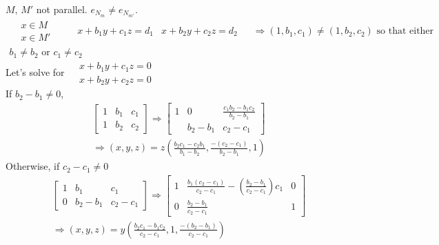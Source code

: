 \documentclass[twoside]{amsart}
\theoremstyle{plain}
\theoremstyle{definition}
\newcommand{\exercisehead}[1]
  {\smallskip
   \noindent{\small\bf Exercise #1.}}
\begin{document}
\exercisehead{22} $M, \, M'$ not parallel.  $e_{N_m} \neq e_{N_{m'}}$. 
\[
\begin{gathered}
\begin{aligned}
  & x \in M \\
  &  x \in M'
\end{aligned} \quad \, \begin{aligned}
  & x + b_1 y + c_1 z = d_1 
  & x + b_2 y + c_2 z = d_2
\end{aligned} \quad \, \Longrightarrow (1,b_1,c_1) \neq (1,b_2,c_2) \text{ so that either } \\
b_1 \neq b_2 \text{ or } c_1 \neq c_2
\end{gathered}
\]
Let's solve for $\begin{aligned}
  & x + b_1 y + c_1 z = 0 \\
  & x + b_2 y + c_2 z = 0
\end{aligned}$ \quad \medskip \\
If $b_2 - b_1 \neq 0$,
\[
\begin{gathered}
  \left[ \begin{matrix} 1 & b_1 & c_1 \\
      1 & b_2 & c_2 
      \end{matrix} \right] \Longrightarrow \left[ \begin{matrix} 1 & 0 & \frac{ c_1 b_2 -b_1 c_2 }{ b_2 - b_1 } \\
      & b_2 -b_1 & c_2 - c_1 \end{matrix} \right] \\
  \Longrightarrow (x,y,z) = z \left( \frac{ b_2 c_1 - c_2 b_1}{ b_1 - b_2 }, \frac{ - (c_2 -c_1) }{ b_2 - b_1 }, 1 \right)
\end{gathered}
\]
Otherwise, if $c_2 - c_1 \neq 0$
\[
\begin{gathered}
  \left[ \begin{matrix} 1 & b_1 & c_1 \\
      0 & b_2 - b_1 & c_2 - c_1 
      \end{matrix} \right] \Longrightarrow \left[ 
    \begin{matrix} 
      1 & \frac{ b_1 ( c_2 - c_1 ) }{ c_2 -c_1 } - \left( \frac{ b_2 - b_1 }{ c_2 -c_1 } \right) c_1 & 0 \\
      0 & \frac{ b_2 -b_1 }{c_2 -c_1 } & 1 
\end{matrix} \right] \\
  \Longrightarrow (x,y,z) = y \left( \frac{ b_2 c_1 - b_1 c_2 }{ c_2 -c_1 }, 1 , \frac{ -(b_2 -b_1) }{c_2 - c_1} \right)
\end{gathered}
\]
\end{document}
